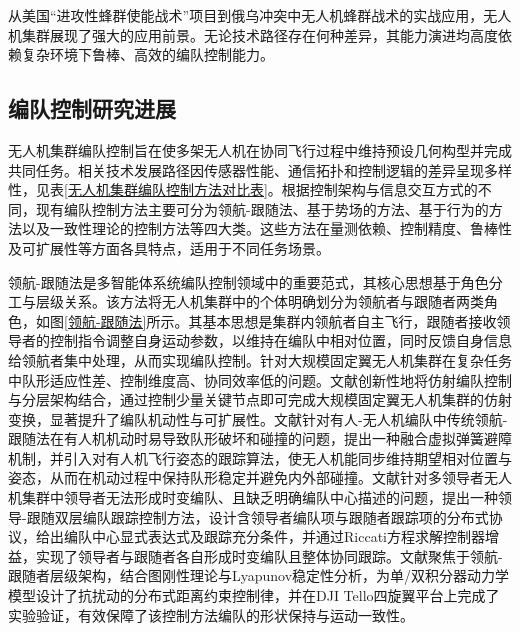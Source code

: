 从美国“进攻性蜂群使能战术”项目到俄乌冲突中无人机蜂群战术的实战应用，无人机集群展现了强大的应用前景。无论技术路径存在何种差异，其能力演进均高度依赖复杂环境下鲁棒、高效的编队控制能力。
\subsection{编队控制研究进展}
无人机集群编队控制旨在使多架无人机在协同飞行过程中维持预设几何构型并完成共同任务。相关技术发展路径因传感器性能、通信拓扑和控制逻辑的差异呈现多样性，见表\ref{无人机集群编队控制方法对比表}。根据控制架构与信息交互方式的不同，现有编队控制方法主要可分为领航-跟随法、基于势场的方法、基于行为的方法以及一致性理论的控制方法等四大类。这些方法在量测依赖、控制精度、鲁棒性及可扩展性等方面各具特点，适用于不同任务场景。

\begin{table}[H]
	\centering
	\caption{无人机集群编队控制方法对比}
	\label{无人机集群编队控制方法对比表}
\end{table}

领航-跟随法是多智能体系统编队控制领域中的重要范式，其核心思想基于角色分工与层级关系。该方法将无人机集群中的个体明确划分为领航者与跟随者两类角色，如图\ref{领航-跟随法}所示。其基本思想是集群内领航者自主飞行，跟随者接收领导者的控制指令调整自身运动参数，以维持在编队中相对位置，同时反馈自身信息给领航者集中处理，从而实现编队控制。针对大规模固定翼无人机集群在复杂任务中队形适应性差、控制维度高、协同效率低的问题。文献\parencite{1022813032.nh}创新性地将仿射编队控制与分层架构结合，通过控制少量关键节点即可完成大规模固定翼无人机集群的仿射变换，显著提升了编队机动性与可扩展性。文献\parencite{XDYX20250820001}针对有人-无人机编队中传统领航-跟随法在有人机机动时易导致队形破坏和碰撞的问题，提出一种融合虚拟弹簧避障机制，并引入对有人机飞行姿态的跟踪算法，使无人机能同步维持期望相对位置与姿态，从而在机动过程中保持队形稳定并避免内外部碰撞。文献\parencite{BJHK202407029}针对多领导者无人机集群中领导者无法形成时变编队、且缺乏明确编队中心描述的问题，提出一种领导-跟随双层编队跟踪控制方法，设计含领导者编队项与跟随者跟踪项的分布式协议，给出编队中心显式表达式及跟踪充分条件，并通过Riccati方程求解控制器增益，实现了领导者与跟随者各自形成时变编队且整体协同跟踪。文献\parencite{ANGHELUTA202573}聚焦于领航-跟随者层级架构，结合图刚性理论与Lyapunov稳定性分析，为单/双积分器动力学模型设计了抗扰动的分布式距离约束控制律，并在DJI Tello四旋翼平台上完成了实验验证，有效保障了该控制方法编队的形状保持与运动一致性。

